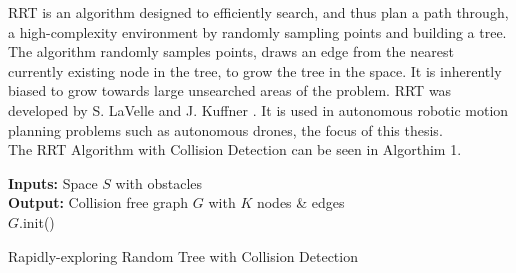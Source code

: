 

\ac{RRT} is an algorithm designed to efficiently search, and thus plan a path through, a high-complexity environment by randomly sampling points and building a tree. The algorithm randomly samples points, draws an edge from the nearest currently existing node in the tree, to grow the tree in the space. It is inherently biased to grow towards large unsearched areas of the problem. RRT was developed by S. LaVelle \cite{LaValle1998} and J. Kuffner \cite{LaValle2001}. It is used in autonomous robotic motion planning problems such as autonomous drones, the focus of this thesis. \\

The RRT Algorithm with Collision Detection can be seen in Algorthim 1.

\begin{algorithm}[H]
\SetAlgoLined
\textbf{Inputs:} Space $S$ with obstacles \\ 
\textbf{Output:} Collision free graph $G$ with $K$ nodes \& edges \\
    $G$.init()\;
 \caption{Rapidly-exploring Random Tree with Collision Detection}
\end{algorithm}